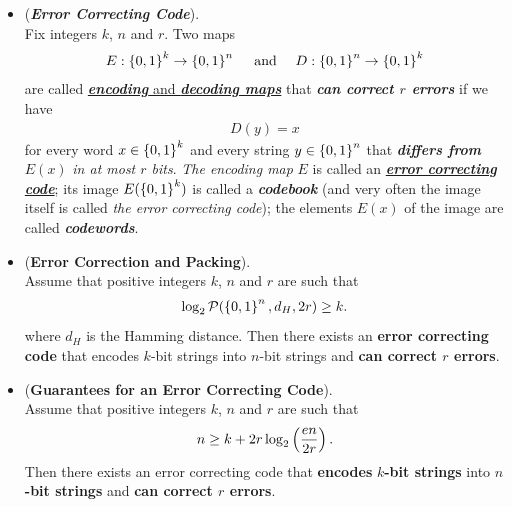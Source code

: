 \documentclass[11pt]{article}
\begin{document}
\begin{itemize}
\item \begin{definition} (\textbf{\emph{Error Correcting Code}}).  \citep{vershynin2018high}\\
Fix integers $k$, $n$ and $r$. Two maps
\begin{align*}
E : \left\{0, 1\right\}^k \to \left\{0, 1\right\}^n \quad \text{ and } \quad D: \left\{0, 1\right\}^n \to \left\{0, 1\right\}^k
\end{align*} are called \underline{\emph{\textbf{encoding}} and \emph{\textbf{decoding maps}}} that \emph{\textbf{can correct $r$ errors}} if we have
\begin{align*}
D(y) = x
\end{align*} for every word $x \in  \left\{0, 1\right\}^k$ and every string $y \in  \left\{0, 1\right\}^n$ that \textbf{\emph{differs from}} $E(x)$ \emph{in at most $r$ bits}. \emph{The encoding map} $E$ is called an \underline{\emph{\textbf{error correcting code}}}; its image $E(\left\{0, 1\right\}^k)$ is called a \emph{\textbf{codebook}} (and very often the image itself is called \emph{the error correcting code}); the elements $E(x)$ of the image are called \emph{\textbf{codewords}}.
\end{definition}

\item \begin{lemma}(\textbf{Error Correction and Packing}). \citep{vershynin2018high}\\
Assume that positive integers $k$, $n$ and $r$ are such that
\begin{align}
\log_2 {\mathcal P}(\left\{0, 1\right\}^n, d_H, 2r) \ge k. \label{ineqn: error_coding_packing_number}
\end{align} where $d_H$ is the Hamming distance. Then there exists an \textbf{error correcting code} that encodes $k$-bit strings into $n$-bit
strings and \textbf{can correct $r$ errors}.
\end{lemma}

\item \begin{theorem} (\textbf{Guarantees for an Error Correcting Code}). \citep{vershynin2018high}\\
Assume that positive integers $k$, $n$ and $r$ are such that
\begin{align}
n \ge k + 2r\log_2\left(\frac{en}{2r}\right). \label{ineqn: error_corresting_coding}
\end{align}
Then there exists an error correcting code that \textbf{encodes} \textbf{$k$-bit strings} into \textbf{$n$-bit strings} and \textbf{can correct $r$ errors}.
\end{theorem}
\end{itemize}
\end{document}
